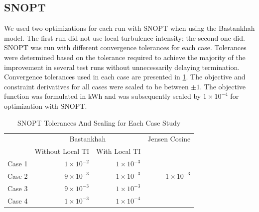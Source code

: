 \documentclass{jpconf}
\begin{document}
\subsection{SNOPT}
We used two optimizations for each run with SNOPT when using the Bastankhah model. The first run did not use local turbulence intensity; the second one did. SNOPT was run with different convergence tolerances for each case. Tolerances were determined based on the tolerance required to achieve the majority of the improvement in several test runs without unnecessarily delaying termination. Convergence tolerances used in each case are presented in \cref{tab:snopttols}. The objective and constraint derivatives for all cases were scaled to be between $\pm1$. The objective function was formulated in kWh and was subsequently scaled by $1\times10^{-4}$ for optimization with SNOPT.
%
\begin{table}[h!]
	\centering
	\caption{SNOPT Tolerances And Scaling for Each Case Study}
	\label{tab:snopttols}
	\begin{tabular}{lrrr}
		\toprule
		{} & \multicolumn{2}{c}{Bastankhah } & Jensen Cosine \\
		\cmidrule(lr){2-3} \cmidrule(lr){4-4}
		 & Without Local TI & With Local TI &  \\
		\cmidrule(lr){2-3} 
		Case 1 &  $1\times10^{-2}$ & $1\times10^{-3}$ & \\
		Case 2 & $9\times10^{-3}$ & $1\times10^{-3}$ & $1\times10^{-3}$ \\
		Case 3 & $9\times10^{-3}$ & $1\times10^{-3}$ & \\
		Case 4 &  $1\times10^{-3}$ & $1\times10^{-4}$ &  \\
		\bottomrule
	\end{tabular}
\end{table}
\end{document}
